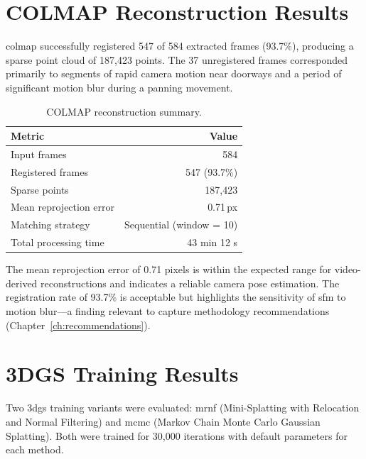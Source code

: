 \section{COLMAP Reconstruction Results}
\label{sec:res-colmap}

\acrshort{colmap} successfully registered 547 of 584 extracted frames (93.7\%), producing a sparse point cloud of 187,423 points. The 37 unregistered frames corresponded primarily to segments of rapid camera motion near doorways and a period of significant motion blur during a panning movement.

\begin{table}[htbp]
  \centering
  \caption{COLMAP reconstruction summary.}
  \label{tab:colmap-results}
  \begin{tabular}{@{}lr@{}}
    \toprule
    \textbf{Metric} & \textbf{Value} \\
    \midrule
    Input frames              & 584 \\
    Registered frames         & 547 (93.7\%) \\
    Sparse points             & 187,423 \\
    Mean reprojection error   & 0.71\,px \\
    Matching strategy         & Sequential (window = 10) \\
    Total processing time     & 43 min 12 s \\
    \bottomrule
  \end{tabular}
\end{table}

The mean reprojection error of 0.71 pixels is within the expected range for video-derived reconstructions and indicates a reliable camera pose estimation. The registration rate of 93.7\% is acceptable but highlights the sensitivity of \acrshort{sfm} to motion blur---a finding relevant to capture methodology recommendations (Chapter~\ref{ch:recommendations}).

\section{3DGS Training Results}
\label{sec:res-training}

Two \acrshort{3dgs} training variants were evaluated: \acrshort{mrnf} (Mini-Splatting with Relocation and Normal Filtering) and \acrshort{mcmc} (Markov Chain Monte Carlo Gaussian Splatting). Both were trained for 30,000 iterations with default parameters for each method.

